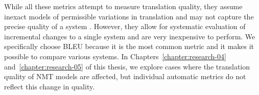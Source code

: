 While all these metrics attempt to measure translation quality, they assume inexact models of permissible variations in translation and may not capture the precise quality of a system \citep{callison-burch-etal-2006-evaluating}.
However, they allow for systematic evaluation of incremental changes to a single system and are very inexpensive to perform. 
We specifically choose BLEU because it is the most common metric and it makes it possible to compare various systems.
In Chapters~\ref{chapter:research-04} and~\ref{chapter:research-05} of this thesis, we explore cases where the translation quality of NMT models are affected, but individual automatic metrics do not reflect this change in quality. 
